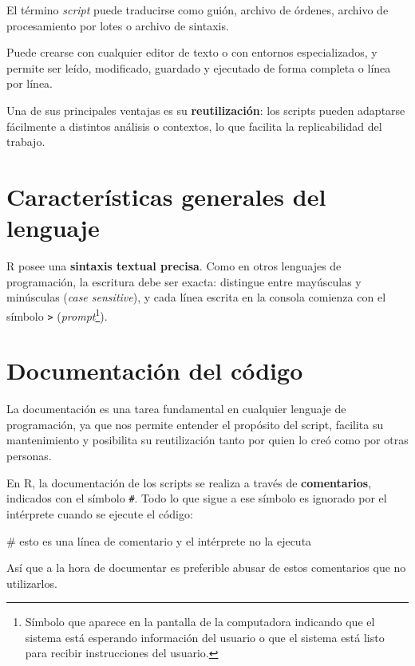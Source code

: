 \documentclass[
  spanish,
  letterpaper,
  DIV=11,
  numbers=noendperiod]{scrreprt}
\newenvironment{Shaded}{\begin{snugshade}}{\end{snugshade}}
\newcommand{\CommentTok}[1]{\textcolor[rgb]{0.37,0.37,0.37}{#1}}
\begin{document}
El término \emph{script} puede traducirse como guión, archivo de
órdenes, archivo de procesamiento por lotes o archivo de sintaxis.

Puede crearse con cualquier editor de texto o con entornos
especializados, y permite ser leído, modificado, guardado y ejecutado de
forma completa o línea por línea.

Una de sus principales ventajas es su \textbf{reutilización}: los
scripts pueden adaptarse fácilmente a distintos análisis o contextos, lo
que facilita la replicabilidad del trabajo.

\section{Características generales del
lenguaje}\label{caracteruxedsticas-generales-del-lenguaje}

R posee una \textbf{sintaxis textual precisa}. Como en otros lenguajes
de programación, la escritura debe ser exacta: distingue entre
mayúsculas y minúsculas (\emph{case sensitive}), y cada línea escrita en
la consola comienza con el símbolo \texttt{\textgreater{}}
(\emph{prompt}\footnote{Símbolo que aparece en la pantalla de la
  computadora indicando que el sistema está esperando información del
  usuario o que el sistema está listo para recibir instrucciones del
  usuario.}).

\section{Documentación del código}\label{documentaciuxf3n-del-cuxf3digo}

La documentación es una tarea fundamental en cualquier lenguaje de
programación, ya que nos permite entender el propósito del script,
facilita su mantenimiento y posibilita su reutilización tanto por quien
lo creó como por otras personas.

En R, la documentación de los scripts se realiza a través de
\textbf{comentarios}, indicados con el símbolo \texttt{\#}. Todo lo que
sigue a ese símbolo es ignorado por el intérprete cuando se ejecute el
código:

\begin{Shaded}
\begin{Highlighting}[]
\CommentTok{\# esto es una línea de comentario y el intérprete no la ejecuta}
\end{Highlighting}
\end{Shaded}

Así que a la hora de documentar es preferible abusar de estos
comentarios que no utilizarlos.
\end{document}
